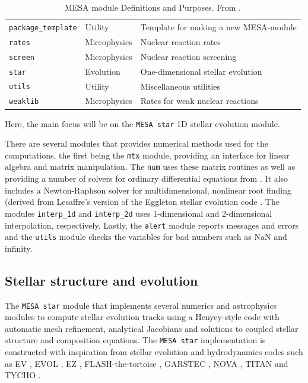 \begin{table}[htbp]
{\begin{tabular}{lll}
\texttt{package\_template}  & Utility          &    Template for making a new MESA-module            \\
\texttt{rates}              & Microphysics     &    Nuclear reaction rates                          \\
\texttt{screen}             & Microphysics     &    Nuclear reaction screening                          \\
\texttt{star}               & Evolution        &    One-dimensional stellar evolution                          \\
\texttt{utils}              & Utility          &    Miscellaneous utilities                          \\ 
\texttt{weaklib}            & Microphysics     &    Rates for weak nuclear reactions                        \\ \hline
\end{tabular}
}
\caption{MESA module Definitions and Purposes. From \citep{paxton2010}.}
\label{modules}
\end{table}
 
Here, the main focus will be on the \texttt{MESA star} 1D stellar evolution module. 

There are several modules that provides numerical methods used for the computations, the first being the  \texttt{mtx} module, providing an interface for linear algebra and matrix manipulation. The \texttt{num} uses these matrix routines as well as providing a number of solvers for ordinary differential equations from \citet{wanner1996solving}. It also includes a Newton-Raphson solver for multidimensional, nonlinear root finding (derived from Lesaffre's version of the Eggleton stellar evolution code \citep{eggleton1971evolution, pols1995approximate, lesaffre2006c}. The modules \texttt{interp\_1d} and \texttt{interp\_2d} uses 1-dimensional and 2-dimensional interpolation, respectively. Lastly, the \texttt{alert} module reports messages and errors and the \texttt{utils} module checks the variables for bad numbers such as NaN and infinity. 

\subsection{Stellar structure and evolution}

The \texttt{MESA star} module that implements several numerics and astrophysics modules to compute stellar evolution tracks using a Henyey-style code \citep{henyey1959method} with automatic mesh refinement, analytical Jacobians and solutions to coupled stellar structure and composition equations. The \texttt{MESA star} implementation is constructed with inspiration from stellar evolution and hydrodynamics codes such as EV \citep{eggleton1971evolution}, EVOL \citep{herwig2004evolution}, EZ \citep{paxton2004ez}, FLASH-the-tortoise \citep{lesaffre2006c}, GARSTEC \citep{weiss2008garstec}, NOVA \citep{starrfield2000effects}, TITAN \citep{gehmeyr1994adaptive} and TYCHO \citep{young2005observational}.

